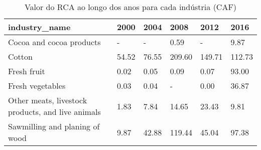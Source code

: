 \begin{table}
\centering
\caption{Valor do RCA ao longo dos anos para cada indústria (CAF)}
\begin{tabular}{p{6cm}p{1.5cm}p{1.5cm}p{1.5cm}p{1.5cm}p{1.5cm}}
\toprule
                                    industry\_name &  2000 &  2004 &   2008 &   2012 &   2016 \\
\midrule
                         Cocoa and cocoa products &     - &     - &   0.59 &      - &   9.87 \\
                                           Cotton & 54.52 & 76.55 & 209.60 & 149.71 & 112.73 \\
                                      Fresh fruit &  0.02 &  0.05 &   0.09 &   0.07 &  93.00 \\
                                 Fresh vegetables &  0.03 &  0.04 &      - &   0.00 &  36.87 \\
Other meats, livestock products, and live animals &  1.83 &  7.84 &  14.65 &  23.43 &   9.81 \\
                   Sawmilling and planing of wood &  9.87 & 42.88 & 119.44 &  45.04 &  97.38 \\
\bottomrule
\end{tabular}
\end{table}
